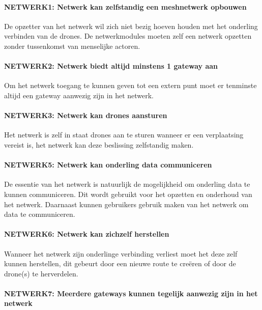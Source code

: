 \documentclass[a4paper, 11pt, oneside]{report}
\begin{document}
\paragraph{NETWERK1: Netwerk kan zelfstandig een meshnetwerk opbouwen}
\hypertarget{NETWERK1}{}

De opzetter van het netwerk wil zich niet bezig hoeven houden met het onderling verbinden van de drones. De netwerkmodules moeten zelf een netwerk opzetten zonder tussenkomst van menselijke actoren.

\paragraph{NETWERK2: Netwerk biedt altijd minstens 1 gateway aan}
\hypertarget{NETWERK2}{}

Om het netwerk toegang te kunnen geven tot een extern punt moet er tenminste altijd een gateway aanwezig zijn in het netwerk.

\paragraph{NETWERK3: Netwerk kan drones aansturen}
\hypertarget{NETWERK3}{}

Het netwerk is zelf in staat drones aan te sturen wanneer er een verplaatsing vereist is, het netwerk kan deze beslissing zelfstandig maken.

\paragraph{NETWERK5: Netwerk kan onderling data communiceren}
\hypertarget{NETWERK5}{}

De essentie van het netwerk is natuurlijk de mogelijkheid om onderling data te kunnen communiceren. Dit wordt gebruikt voor het opzetten en onderhoud van het netwerk. Daarnaast kunnen gebruikers gebruik maken van het netwerk om data te communiceren.

\paragraph{NETWERK6: Netwerk kan zichzelf herstellen}
\hypertarget{NETWERK6}{}

Wanneer het netwerk zijn onderlinge verbinding verliest moet het deze zelf kunnen herstellen, dit gebeurt door een nieuwe route te creëren of door de drone(s) te herverdelen.

\paragraph{NETWERK7: Meerdere gateways kunnen tegelijk aanwezig zijn in het netwerk}
\hypertarget{NETWERK7}{}
\end{document}
